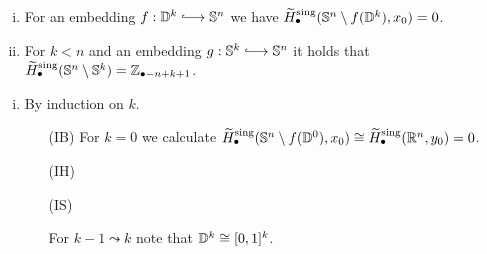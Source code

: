 	\begin{proposition}
		\vspace{-1.5em}
		\begin{enumerate}[(i)]
			\item{
				For an embedding $f:\D^k \longrightincl \S^n$ we have $\widetilde{H}_\bullet^\text{sing}(\mathbb{S}^n \setminus f(\mathbb{D}^k),x_0) = 0$.
			}
			\item{
				For $k<n$ and an embedding $g: \S^k \longrightincl \S^n$ it holds that $\widetilde{H}_\bullet^\text{sing}(\mathbb{S}^n \setminus \mathbb{S}^k) = \mathbb{Z}_{\bullet-n+k+1}$.
			}
		\end{enumerate}
	\end{proposition}
	\begin{sketch}
		\begin{enumerate}[(i)]
			\item{
				By induction on $k$.
				\begin{enumerate}
					\item[(IB)]{
						For $k=0$ we calculate $\widetilde{H}_\bullet^\text{sing}(\mathbb{S}^n \setminus f(\mathbb{D}^0),x_0) \cong \widetilde{H}_\bullet^\text{sing}(\mathbb{R}^n,y_0) = 0$.
					}
					\item[(IH)]{
					}
					\item[(IS)]{
						For $k-1 \leadsto k$ note that $\mathbb{D}^k \cong [0,1]^k$.

}
\end{enumerate}}
\end{enumerate}
\end{sketch}
